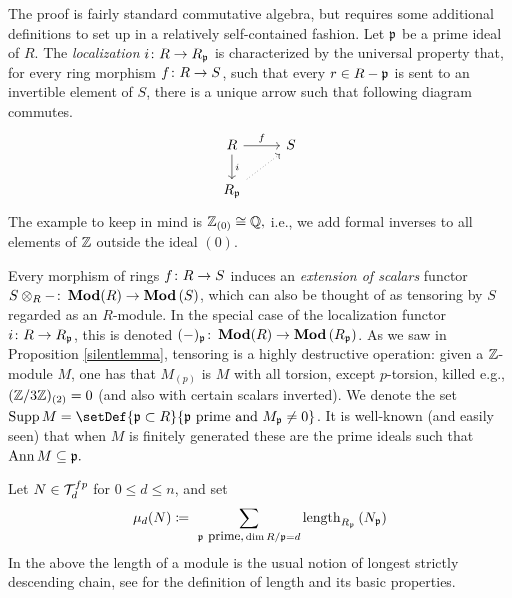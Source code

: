 \documentclass[runningheads]{llncs}
\begin{document}
\begin{proofE}
The proof is fairly standard commutative algebra, but requires some additional definitions to set up in a relatively self-contained fashion.
Let $\mathfrak p$ be a prime ideal of $R$. 
The \emph{localization} $i\colon R \to R_{\mathfrak p}$ is characterized by the universal property that, for every ring morphism $f \colon R \to S$, such that every $r \in R - \mathfrak p$ is sent to an invertible element of $S$, there is a unique arrow such that following diagram commutes.
\begin{equation*}
\begin{tikzcd}
R \dar{i} \rar{f} & S
\\
R_\p \arrow[ur, dotted] & \
\end{tikzcd}
\end{equation*}
The example to keep in mind is $\mathbb{Z}_{(0)} \cong \mathbb{Q},$ i.e., we add formal inverses to all elements of $\mathbb{Z}$ outside the ideal $(0)$.

Every morphism of rings $f\colon R\to S$ induces an \emph{extension of scalars} functor $S \otimes_R - \colon \operatorname{\mathbf{Mod}}(R) \to \operatorname{\mathbf{Mod}}{(S)}$, which can also be thought of as tensoring by $S$ regarded as an $R$-module. 
In the special case of the localization functor $i\colon R \to R_\mathfrak p$, this  is denoted $(-)_\mathfrak p \colon \operatorname{\mathbf{Mod}}(R) \to \operatorname{\mathbf{Mod}}{\left(R_\mathfrak p\right)}$.
As we saw in Proposition \ref{silentlemma}, tensoring is a highly destructive operation: given a $\mathbb{Z}$-module $M$, one has that $M_{(p)}$ is $M$ with all torsion, except $p$-torsion, killed e.g., $(\mathbb{Z}/ 3\mathbb{Z})_{(2)} = 0$ (and also with certain scalars inverted).
 We denote the set $\Supp M = \setDef{\p \subset R}{ \p \mbox{ prime and } M_\p \neq 0}$. 
It is well-known (and easily seen) that when $M$ is finitely generated these are the prime ideals such that $\operatorname{Ann} M \subseteq  \mathfrak p.$

Let $N \in \mathcal T_d^{fp}$ for $0 \leq d \leq n$, and set
\begin{equation*}
  \mu_d(N) \coloneqq\ \sum_{\p  \mbox{ \small prime,} \dim R/\p  =  d}
     \operatorname{length}_{R_{\p}} \left( N_{\p} \right)
\end{equation*}
In the above the length of a module is the usual notion of longest strictly descending chain, see \cite[Section 10.52]{stacks-project} for the definition of length and its basic properties.


\end{proofE}
\end{document}
